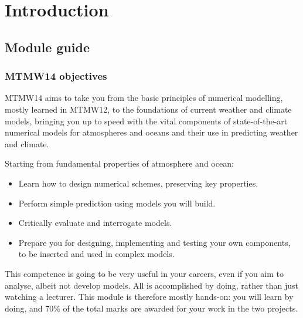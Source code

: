 \documentclass[11pt,fleqn]{book} %
\begin{document}
	\renewcommand\contentsname{Table of Contents}
	\renewcommand{\bibname}{Bibliography}
	\tableofcontents%
	
	
	\pagestyle{fancy} %
	
	
\chapter{Introduction}
	
	\section{Module guide}
	\subsection{MTMW14 objectives}
	MTMW14 aims to take you from the basic principles of numerical modelling, mostly learned in MTMW12, to the foundations of current weather and climate models, bringing you up to speed with the vital components of state-of-the-art numerical models for atmospheres and oceans and their use in predicting weather and climate.
	
	Starting from fundamental properties of atmosphere and ocean:
\begin{itemize}
\item	Learn how to design numerical schemes, preserving key properties.
\item	Perform simple prediction using models you will build.
\item	Critically evaluate and interrogate models.
\item	Prepare you for designing, implementing and testing your own components, to be inserted and used in complex models.
\end{itemize}
	
	This competence is going to be very useful in your careers, even if you aim to analyse, albeit not develop models. All is accomplished by doing, rather than just watching a lecturer.  This module is therefore mostly hands-on: you will learn by doing, and 70\% of the total marks are awarded for your work in the two projects. 
	
\end{document}
